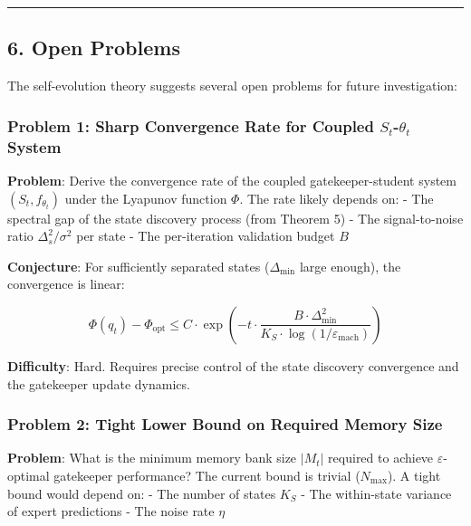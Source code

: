 \documentclass[
  12pt,
]{ctexart}
\begin{document}
\begin{center}\rule{0.5\linewidth}{0.5pt}\end{center}

\subsection{6. Open Problems}\label{open-problems}

The self-evolution theory suggests several open problems for future
investigation:

\subsubsection{\texorpdfstring{Problem 1: Sharp Convergence Rate for
Coupled \(S_t\)-\(\theta_t\)
System}{Problem 1: Sharp Convergence Rate for Coupled S\_t-\textbackslash theta\_t System}}\label{problem-1-sharp-convergence-rate-for-coupled-s_t-theta_t-system}

\textbf{Problem}: Derive the convergence rate of the coupled
gatekeeper-student system \((S_t, f_{\theta_t})\) under the Lyapunov
function \(\Phi\). The rate likely depends on: - The spectral gap of the
state discovery process (from Theorem 5) - The signal-to-noise ratio
\(\Delta_s^2/\sigma^2\) per state - The per-iteration validation budget
\(B\)

\textbf{Conjecture}: For sufficiently separated states
(\(\Delta_{\min}\) large enough), the convergence is linear:

\[\Phi(q_t) - \Phi_{\text{opt}} \leq C \cdot \exp\left(-t \cdot \frac{B \cdot \Delta_{\min}^2}{K_S \cdot \log(1/\varepsilon_{\text{mach}})}\right)\]

\textbf{Difficulty}: Hard. Requires precise control of the state
discovery convergence and the gatekeeper update dynamics.

\subsubsection{Problem 2: Tight Lower Bound on Required Memory
Size}\label{problem-2-tight-lower-bound-on-required-memory-size}

\textbf{Problem}: What is the minimum memory bank size \(|M_t|\)
required to achieve \(\varepsilon\)-optimal gatekeeper performance? The
current bound is trivial (\(N_{\text{max}}\)). A tight bound would
depend on: - The number of states \(K_S\) - The within-state variance of
expert predictions - The noise rate \(\eta\)
\end{document}
